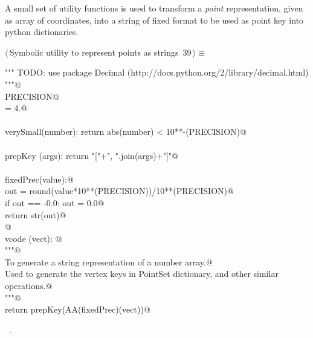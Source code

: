 \documentclass[11pt,oneside]{article}	%
\begin{document}
A small set of utility functions is used to transform a \emph{point} representation, given as array of coordinates, into a string of fixed format to be used as point key into python dictionaries.

\begin{flushleft} \small \label{scrap51}
\protect{}$\langle\,$Symbolic utility to represent points as strings\nobreak\ {\footnotesize 39}$\,\rangle\equiv$
\vspace{-1ex}
\begin{list}{}{} \item
\mbox{}\verb@""" TODO: use package Decimal (http://docs.python.org/2/library/decimal.html) """@\\
\mbox{}\verb@global PRECISION@\\
\mbox{}\verb@PRECISION = 4.@\\
\mbox{}\verb@@\\
\mbox{}\verb@def verySmall(number): return abs(number) < 10**-(PRECISION)@\\
\mbox{}\verb@@\\
\mbox{}\verb@def prepKey (args): return "["+", ".join(args)+"]"@\\
\mbox{}\verb@@\\
\mbox{}\verb@def fixedPrec(value):@\\
\mbox{}\verb@   out = round(value*10**(PRECISION))/10**(PRECISION)@\\
\mbox{}\verb@   if out == -0.0: out = 0.0@\\
\mbox{}\verb@   return str(out)@\\
\mbox{}\verb@   @\\
\mbox{}\verb@def vcode (vect): @\\
\mbox{}\verb@   """@\\
\mbox{}\verb@   To generate a string representation of a number array.@\\
\mbox{}\verb@   Used to generate the vertex keys in PointSet dictionary, and other similar operations.@\\
\mbox{}\verb@   """@\\
\mbox{}\verb@   return prepKey(AA(fixedPrec)(vect))@\\
\mbox{}\verb@@{\NWsep}
\end{list}
\vspace{-1ex}
\footnotesize\addtolength{\baselineskip}{-1ex}
\begin{list}{}{\setlength{\itemsep}{-\parsep}\setlength{\itemindent}{-\leftmargin}}
\item \NWtxtMacroRefIn\ .
\end{list}
\end{flushleft}




\end{document}
